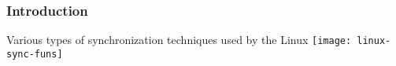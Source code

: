 \begin{frame}[plain]	
	\frametitle{Introduction}
	\centering \Large
	Various types of synchronization techniques used by the Linux
	\texttt{[image: linux-sync-funs]}

\end{frame}

%
%
%


